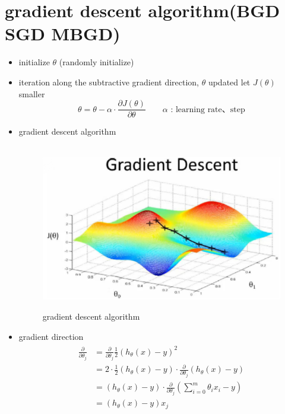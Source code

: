 \documentclass[12pt]{ctexart}%
\begin{document}
	\section{\quad gradient descent algorithm(BGD SGD MBGD)}
		\begin{itemize}
			\item initialize $\theta$ (randomly initialize)
			
			\item iteration along the subtractive gradient direction, $\theta$ updated let $J(\theta)$ smaller
			\begin{equation}
				\theta = \theta - \alpha\cdot\frac{\partial J(\theta)}{\partial \theta} \qquad\alpha\text{ : learning rate、step}
			\end{equation}
			
			\item gradient descent algorithm			
				\begin{figure}[H]
					\vspace{-0.2cm}  %
					\setlength{\abovecaptionskip}{-0.2cm}   %
					\centering
					\includegraphics[scale=0.4]{gradient_descent.png}
					\renewcommand{\figurename}{Fig} %
					\caption{gradient descent algorithm}
					\label{fig:2}
				\end{figure}
			
			\item gradient direction
				\begin{align}
					\begin{split}
						\frac{\partial}{\partial\theta_j} &= \frac{\partial}{\partial\theta_j}\frac{1}{2}(h_\theta(x) - y)^2\\
						&= 2\cdot\frac{1}{2}(h_\theta(x) - y)\cdot\frac{\partial}{\partial\theta_j}(h_\theta(x) - y)\\
						&= (h_\theta(x) - y)\cdot\frac{\partial}{\partial\theta_j}(\sum_{i=0}^{m}\theta_i x_i -y)\\
						&= (h_\theta(x) - y)x_j
					\end{split}
				\end{align}
				

\end{itemize}
\end{document}
